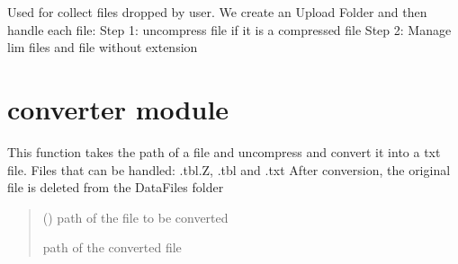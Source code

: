 \documentclass[letterpaper,10pt,english]{sphinxmanual}
\begin{document}

\begin{fulllineitems}
\label{\detokenize{app:app.upload}}
\pysigstartsignatures
{}
\pysigstopsignatures
\sphinxAtStartPar
Used for collect files dropped by user. We create an Upload Folder and then handle each file:
Step 1: uncompress file if it is a compressed file
Step 2: Manage lim files and file without extension

\end{fulllineitems}


\sphinxstepscope


\chapter{converter module}
\label{\detokenize{converter:module-converter}}\label{\detokenize{converter:converter-module}}\label{\detokenize{converter::doc}}

\begin{fulllineitems}
\label{\detokenize{converter:converter.handle_file}}
\pysigstartsignatures
{}
\pysigstopsignatures
\sphinxAtStartPar
This function takes the path of a file and uncompress and convert it into a txt file.
Files that can be handled: .tbl.Z, .tbl and .txt
After conversion, the original file is deleted from the DataFiles folder
\begin{quote}\begin{description}
\sphinxAtStartPar
{} () \textendash{} path of the file to be converted

\sphinxAtStartPar
path of the converted file

\end{description}\end{quote}

\end{fulllineitems}
\end{document}
